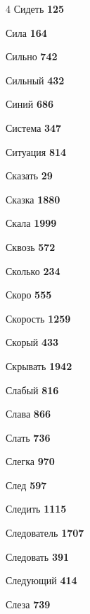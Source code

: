 \begin{multicols}{4}
\noindent Сидеть \dotfill \textbf{\color{secondary} 125}\par
\noindent Сила \dotfill \textbf{\color{secondary} 164}\par
\noindent Сильно \dotfill \textbf{\color{secondary} 742}\par
\noindent Сильный \dotfill \textbf{\color{secondary} 432}\par
\noindent Синий \dotfill \textbf{\color{secondary} 686}\par
\noindent Система \dotfill \textbf{\color{secondary} 347}\par
\noindent Ситуация \dotfill \textbf{\color{secondary} 814}\par
\noindent Сказать \dotfill \textbf{\color{secondary} 29}\par
\noindent Сказка \dotfill \textbf{\color{secondary} 1880}\par
\noindent Скала \dotfill \textbf{\color{secondary} 1999}\par
\noindent Сквозь \dotfill \textbf{\color{secondary} 572}\par
\noindent Сколько \dotfill \textbf{\color{secondary} 234}\par
\noindent Скоро \dotfill \textbf{\color{secondary} 555}\par
\noindent Скорость \dotfill \textbf{\color{secondary} 1259}\par
\noindent Скорый \dotfill \textbf{\color{secondary} 433}\par
\noindent Скрывать \dotfill \textbf{\color{secondary} 1942}\par
\noindent Слабый \dotfill \textbf{\color{secondary} 816}\par
\noindent Слава \dotfill \textbf{\color{secondary} 866}\par
\noindent Слать \dotfill \textbf{\color{secondary} 736}\par
\noindent Слегка \dotfill \textbf{\color{secondary} 970}\par
\noindent След \dotfill \textbf{\color{secondary} 597}\par
\noindent Следить \dotfill \textbf{\color{secondary} 1115}\par
\noindent Следователь \dotfill \textbf{\color{secondary} 1707}\par
\noindent Следовать \dotfill \textbf{\color{secondary} 391}\par
\noindent Следующий \dotfill \textbf{\color{secondary} 414}\par
\noindent Слеза \dotfill \textbf{\color{secondary} 739}\par

\end{multicols}
